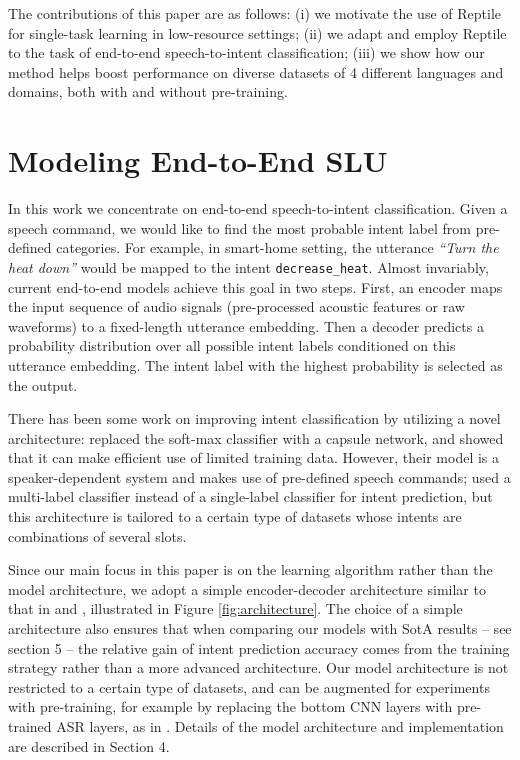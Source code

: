 \documentclass[a4paper]{article}
\begin{document}
	The contributions of this paper are as follows: (i) we motivate the use of Reptile for single-task learning in low-resource settings; (ii) we adapt and employ Reptile to the task of end-to-end speech-to-intent classification; (iii) we show how our method helps boost performance on diverse datasets of 4 different languages and domains, both with and without pre-training.
	
	
	\section{Modeling End-to-End SLU}
	In this work we concentrate on end-to-end speech-to-intent classification. Given a speech command, we would like to find the most probable intent label from pre-defined categories. For example, in smart-home setting, the utterance \textit{``Turn the heat down''} would be mapped to the intent \texttt{decrease\_heat}. Almost invariably, current end-to-end models achieve this goal in two steps. First, an encoder maps the input sequence of audio signals (pre-processed acoustic features or raw waveforms) to a fixed-length utterance embedding. Then a decoder predicts a probability distribution over all possible intent labels conditioned on this utterance embedding. The intent label with the highest probability is selected as the output. 
	
	There has been some work on improving intent classification by utilizing a novel architecture: \cite{CapsuleSLU} replaced the soft-max classifier with a capsule network, and showed that it can make efficient use of limited training data. However, their model is a speaker-dependent system and makes use of pre-defined speech commands; \cite{architecture} used a multi-label classifier instead of a single-label classifier for intent prediction, but this architecture is tailored to a certain type of datasets whose intents are combinations of several slots.
	
	Since our main focus in this paper is on the learning algorithm rather than the model architecture, we adopt a simple encoder-decoder architecture similar to that in \cite{serdyuk2018towards} and \cite{Bhosale2019}, illustrated in Figure \ref{fig:architecture}. The choice of a simple architecture also ensures that when comparing our models with SotA results -- see section 5 -- the relative gain of intent prediction accuracy comes from the training strategy rather than a more advanced architecture. Our model architecture is not restricted to a certain type of datasets, and can be augmented for experiments with pre-training, for example by replacing the bottom CNN layers with pre-trained ASR layers, as in \cite{Bhosale2019}.  Details of the model architecture and implementation are described in Section 4.
	
\end{document}
